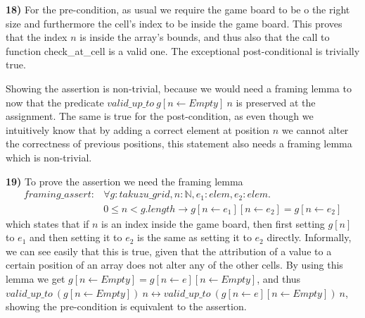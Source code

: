 \documentclass[]{StandardTemplate}
\begin{document}
\textbf{18)} For the pre-condition, as usual we require the game board to be o the right size and furthermore the cell's index to be inside the game board. This proves that the index $ n $ is inside the array's bounds, and thus also that the call to function check\_at\_cell is a valid one. The exceptional post-conditional is trivially true.

Showing the assertion is non-trivial, because we would need a framing lemma to now that the predicate $ valid\_up\_to~g[n\leftarrow  Empty]~n $ is preserved at the assignment. The same is true for the post-condition, as even though we intuitively know that by adding a correct element at position $ n $ we cannot alter the correctness of previous positions, this statement also needs a framing lemma which is non-trivial.

\textbf{19)} To prove the assertion we need the framing lemma 
\begin{align*}
framing\_assert :&\forall g : takuzu\_grid, n : \mathbb{N}, e_1 : elem, e_2 :elem.\\ &0 \leq n < g.length\to g[n\leftarrow e_1][n\leftarrow e_2] = g[n\leftarrow e_2]
\end{align*}
which states that if $ n $ is an index inside the game board, then first setting $ g[n] $ to $ e_1 $ and then setting it to $ e_2 $ is the same as setting it to $ e_2 $ directly. Informally, we can see easily that this is true, given that the attribution of a value to a certain position of an array does not alter any of the other cells. By using this lemma we get $ g[n \leftarrow Empty] = g[n \leftarrow e][n \leftarrow Empty] $, and thus $ valid\_up\_to~(g[n\leftarrow Empty])~n \leftrightarrow  valid\_up\_to~(g[n \leftarrow e][n \leftarrow Empty])~n$, showing the pre-condition is equivalent to the assertion.
\end{document}
